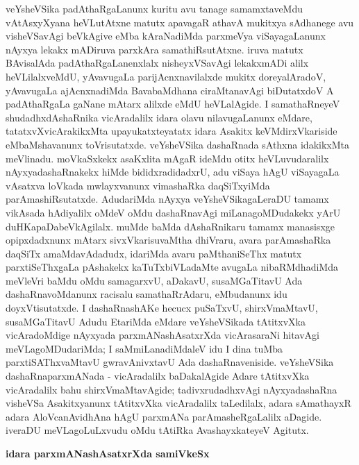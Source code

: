 veYsheVSika padAthaRgaLanunx kuritu avu tanage samamxtaveMdu vAtAsxyXyana heVLutAtxne matutx apavagaR athavA mukitxya sAdhanege avu visheVSavAgi beVkAgive eMba kAraNadiMda parxmeVya viSayagaLanunx nAyxya lekakx mADiruva parxkAra samathiRsutAtxne. iruva matutx BAvisalAda padAthaRgaLanenxlalx nisheyxVSavAgi lekakxmADi alilx heVLilalxveMdU, yAvavugaLa parijAcnxnavilalxde mukitx doreyalAradoV, yAvavugaLa ajAcnxnadiMda BavabaMdhana ciraMtanavAgi biDutatxdoV A padAthaRgaLa gaNane mAtarx alilxde eMdU heVLalAgide. I samathaRneyeV shudadhxdAshaRnika vicAradalilx idara olavu nilavugaLanunx eMdare, tatatxvXvicArakikxMta upayukatxteyatatx idara Asakitx keVMdirxVkariside eMbaMshavanunx toVrisutatxde. veYsheVSika dashaRnada sAthxna idakikxMta meVlinadu. moVkaSxkekx asaKxlita mAgaR ideMdu otitx heVLuvudaralilx nAyxyadashaRnakekx hiMde bididxradidadxrU, adu viSaya hAgU viSayagaLa vAsatxva loVkada mwlayxvanunx vimashaRka daqSiTxyiMda parAmashiRsutatxde. AdudariMda nAyxya veYsheVSikagaLeraDU tamamx vikAsada hAdiyalilx oMdeV oMdu dashaRnavAgi miLanagoMDudakekx yArU duHKapaDabeVkAgilalx. muMde baMda dAshaRnikaru tamamx manasisxge opipxdadxnunx mAtarx sivxVkarisuvaMtha dhiVraru, avara parAmashaRka daqSiTx amaMdavAdadudx, idariMda avaru paMthaniSeThx matutx parxtiSeThxgaLa pAshakekx kaTuTxbiVLadaMte avugaLa nibaRMdhadiMda meVleVri baMdu oMdu samagarxvU, aDakavU, susaMGaTitavU Ada dashaRnavoMdanunx racisalu samathaRrAdaru, eMbudanunx idu doyxVtisutatxde. I dashaRnashAKe hecucx puSaTxvU, shirxVmaMtavU, susaMGaTitavU Adudu EtariMda eMdare veYsheVSikada tAtitxvXka vicAradoMdige nAyxyada parxmANashAsatxrXda vicArasaraNi hitavAgi meVLagoMDudariMda; I saMmiLanadiMdaleV idu I dina tuMba parxtiSAThxvaMtavU gwravAnivxtavU Ada dashaRnaveniside. veYsheVSika dashaRnaparxmANada - vicAradalilx baDakalAgide Adare tAtitxvXka vicAradalilx bahu shirxVmaMtavAgide; tadivxrudadhxvAgi nAyxyadashaRna visheVSa Asakitxyanunx tAtitxvXka vicAradalilx taLedilalx, adara sAmathayxR adara AloVcanAvidhAna hAgU parxmANa parAmasheRgaLalilx aDagide. iveraDU meVLagoLuLxvudu oMdu tAtiRka AvashayxkateyeV Agitutx.

\bigskip
\begin{center}
{\Large\bf idara parxmANashAsatxrXda samiVkeSx}
\end{center}

